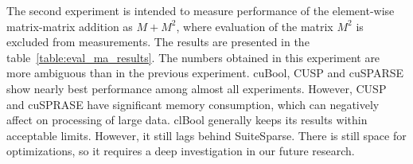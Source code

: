 The second experiment is intended to measure performance of the element-wise matrix-matrix addition as $M + M^2$,
where evaluation of the matrix $M^2$ is excluded from measurements.
The results are presented in the table~\ref{table:eval_ma_results}.
The numbers obtained in this experiment are more ambiguous than in the previous experiment.
cuBool, CUSP and cuSPARSE show nearly best performance among almost all experiments.
However, CUSP and cuSPRASE have significant memory consumption,
which can negatively affect on processing of large data.
clBool generally keeps its results within acceptable limits.
However, it still lags behind SuiteSparse. 
There is still space for optimizations, so it requires a deep investigation in our future research.


